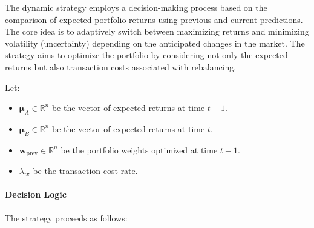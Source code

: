 The dynamic strategy employs a decision-making process based on the comparison of expected portfolio returns using previous and current predictions. The core idea is to adaptively switch between maximizing returns and minimizing volatility (uncertainty) depending on the anticipated changes in the market. The strategy aims to optimize the portfolio by considering not only the expected returns but also transaction costs associated with rebalancing.

Let:

\begin{itemize}
    \item \( \boldsymbol{\mu}_A \in \mathbb{R}^n \) be the vector of expected returns at time \( t-1 \).
    \item \( \boldsymbol{\mu}_B \in \mathbb{R}^n \) be the vector of expected returns at time \( t \).
    \item \( \mathbf{w}_{\text{prev}} \in \mathbb{R}^n \) be the portfolio weights optimized at time \( t-1 \).
    \item \( \lambda_{\text{tx}} \) be the transaction cost rate.
\end{itemize}

\paragraph{Decision Logic}

The strategy proceeds as follows:

